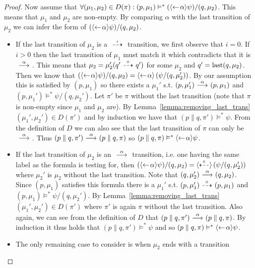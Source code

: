 \begin{proof}
    \rtl Now assume that $\forall (\mu_1,\mu_2) \in D(\pi) : (p,\mu_1) \vDash^* (\mbox{\ensuremath{\langle\leftarrow\! 
    \alpha \rangle}}\psi)/(q,\mu_2)$. This means that $\mu_1$ and $\mu_2$ are non-empty. By comparing
    $\alpha$ with the last transition  of $\mu_2$ we can infer the form of $(\mbox{\ensuremath{\langle\leftarrow\! \alpha \rangle}}
    \psi) / (q,\mu_2)$.
    \begin{itemize}
        \item If the last transition of $\mu_2$ is a $\ {\stackrel{_{i}}{\dashrightarrow}}\ $ transition, we first
            observe that $i=0$. If $i>0$ then the last transition of $\mu_1$ must match
            it which contradicts that it is $\ {\stackrel{{\alpha}}{\longrightarrow}}\ $. This means that $\mu_2
            = \mu_2' (q' \ {\stackrel{_{0}}{\dashrightarrow}}\  q')$ for some $\mu_2$ and $q' = \operatorname{last}(q,\mu_2)$. Then
            we know that $(\mbox{\ensuremath{\langle\leftarrow\! \alpha \rangle}} \psi) / (q,\mu_2) = \mbox{\ensuremath{\langle\leftarrow\! \alpha \rangle}} \left(
            \psi / (q,\mu_2') \right)$. By our assumption this is satisfied by $(p,\mu_1)$
            so there exists a $\mu_1'$ s.t. $(p,\mu_1') \ {\stackrel{{\alpha}}{\longrightarrow}}\  (p,\mu_1)$ and
            $(p,\mu_1') \vDash^* \psi / (q,\mu_2')$. Let $\pi'$ be $\pi$ without the
            last transition (note that $\pi$ is non-empty since $\mu_1$ and $\mu_2$ are).
            By Lemma~\ref{lemma:removing_last_trans} $(\mu_1',\mu_2')\in D(\pi')$ and by
            induction we have that $(p\parallel q,\pi') \vDash^* \psi$. From the definition
            of $D$ we can also see that the last transition of $\pi$ can only be $\ {\stackrel{{\alpha}}{\longrightarrow}}\ $.
            Thus $(p\parallel q,\pi') \ {\stackrel{{\alpha}}{\longrightarrow}}\  (p\parallel q, \pi)$ so $(p\parallel q,\pi)
            \vDash^* \mbox{\ensuremath{\langle\leftarrow\! \alpha \rangle}}\psi$.
        \item If the last transition of $\mu_2$ is an $\ {\stackrel{{\alpha}}{\longrightarrow}}\ $ transition, i.e. one
            having the same label as the formula is testing for, then $(\mbox{\ensuremath{\langle\leftarrow\! \alpha \rangle}}\psi)
            /(q,\mu_2) = \mbox{\ensuremath{\langle\stackrel{_{0}}{\dashleftarrow}\rangle}}\left( \psi/(q,\mu_2') \right)$ where $\mu_2'$ is $\mu_2$
            without the last transition. Note that $(q,\mu_2')\ {\stackrel{{\alpha}}{\longrightarrow}}\ (q,\mu_2)$. Since
            $(p,\mu_1)$ satisfies this formula there is a $\mu_1'$ s.t. $(p,\mu_1')\ {\stackrel{_{0}}{\dashrightarrow}}\ 
            (p,\mu_1)$ and $(p,\mu_1) \vDash^* \psi/(q,\mu_2')$. By
            Lemma~\ref{lemma:removing_last_trans} $(\mu_1',\mu_2')\in D(\pi')$ where $\pi'$
            is again $\pi$ without the last transition. Also again, we can see from the
            definition of $D$ that $(p\parallel q,\pi')\ {\stackrel{{\alpha}}{\longrightarrow}}\ (p\parallel q,\pi)$.
            By induction it thus holds that $(p\parallel q, \pi')\vDash^* \psi$ and so
            $(p\parallel q,\pi) \vDash^* \mbox{\ensuremath{\langle\leftarrow\! \alpha \rangle}}\psi$.
        \item The only remaining case to consider is when $\mu_2$ ends with a transition

\end{itemize}
\end{proof}
